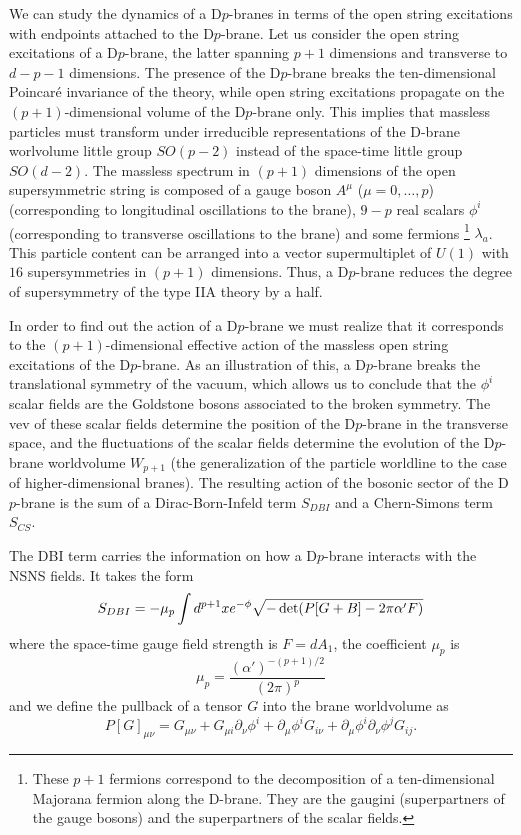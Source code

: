 We can study the dynamics of a D$p$-branes in terms of the open string excitations  with endpoints
attached to the D$p$-brane.
Let us consider the open string excitations of a D$p$-brane, the latter spanning $p+1$ dimensions and transverse to $d-p-1$ dimensions.
The presence of the D$p$-brane breaks the ten-dimensional Poincaré invariance of the theory, while
open string excitations propagate on the $(p+1)$-dimensional volume of the D$p$-brane only.
This implies that massless particles must transform under irreducible representations 
of the D-brane worlvolume little group $SO(p-2)$ instead of the space-time little group $SO(d-2)$.
The massless spectrum in $(p+1)$ dimensions of the open supersymmetric string is composed of a gauge boson $A^\mu$ ($\mu=0,\ldots,p$) (corresponding
to longitudinal oscillations to the brane),
$9-p$ real scalars $\phi^i$ (corresponding to transverse oscillations to the brane) and some fermions
\footnote{
These $p+1$ fermions correspond to the decomposition of a ten-dimensional Majorana fermion along the D-brane. They are the gaugini (superpartners of the gauge bosons) and the superpartners of the scalar fields.}
$\lambda_a$.
This particle content can be arranged into a vector supermultiplet of $U(1)$ with $16$ supersymmetries
in $(p+1)$ dimensions. 
Thus, a D$p$-brane reduces the degree of supersymmetry of the type IIA theory by a half.

In order to find out the action of a D$p$-brane we must realize that it corresponds to the
$(p+1)$-dimensional effective action of the massless open string excitations of the D$p$-brane.
As an illustration of this, a D$p$-brane breaks the translational symmetry of the vacuum, which allows
us to conclude that the $\phi^i$ scalar fields are the Goldstone bosons associated to the broken symmetry. 
The vev of these scalar fields determine the position of the D$p$-brane in the transverse space, and the fluctuations of the scalar
fields determine the evolution of the D$p$-brane worldvolume $W_{p+1}$ (the generalization of the particle worldline to the case of higher-dimensional branes). 
The resulting action of the bosonic sector of the D$p$-brane is the sum of a Dirac-Born-Infeld term $S_{DBI}$ and a Chern-Simons term $S_{CS}$.

The DBI term carries the information on how a D$p$-brane interacts with the NSNS fields. 
It takes the form
\begin{equation}
  S_{DBI}= -\mu_p \int d^{p+1} x e^{-\phi} \sqrt{-\det(P\qty[G+B]-2\pi \alpha'F)}
  \label{eq:dirac}
\end{equation}
where the space-time gauge field strength is $F=dA_1$, the coefficient $\mu_p$ is
\begin{equation}
  \mu_p = \frac{(\alpha')^{-(p+1)/2}}{(2\pi)^p}
\end{equation}
and we define the pullback of a tensor $G$ into the brane worldvolume as
\begin{equation}
  P[G]_{\mu\nu}=G_{\mu\nu}+G_{\mu i}\partial_\nu \phi^i + \partial_\mu \phi^iG_{i\nu}+\partial_\mu\phi^i\partial_\nu\phi^j G_{ij}.
\end{equation}

